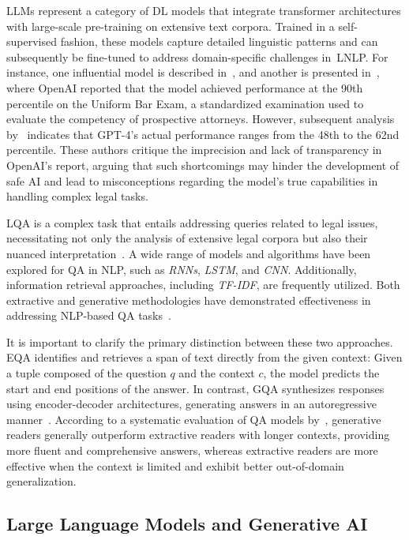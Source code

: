 \documentclass[runningheads]{llncs}
\begin{document}
\Ac{LLMs} represent a category of \ac{DL} models that
integrate transformer architectures with large-scale pre-training on
extensive text corpora. Trained in a self-supervised fashion, these
models capture detailed linguistic patterns and can subsequently be
fine-tuned to address domain-specific challenges in~\ac{LNLP}. For
instance, one influential model is described in~\cite{devlin2018bert},
and another is presented in~\cite{radford2018gpt}, where OpenAI
reported that the model achieved performance at the 90th percentile on
the Uniform Bar Exam, a standardized examination used to evaluate the
competency of prospective attorneys. However, subsequent analysis
by~\cite{Martinez2024} indicates that GPT-4's actual performance
ranges from the 48th to the 62nd percentile. These authors critique
the imprecision and lack of transparency in OpenAI's report, arguing
that such shortcomings may hinder the development of safe \ac{AI} and
lead to misconceptions regarding the model's true capabilities in
handling complex legal tasks.

\Ac{LQA} is a complex task that entails addressing queries related to
legal issues, necessitating not only the analysis of extensive legal
corpora but also their nuanced interpretation~\cite{Ariai2024}. A wide
range of models and algorithms have been explored for \ac{QA} in
\ac{NLP}, such as \textit{\ac{RNNs}}, \textit{\ac{LSTM}}, and
\textit{\ac{CNN}}. Additionally, information retrieval approaches,
including \textit{\ac{TF-IDF}}, are frequently utilized. Both
extractive and generative methodologies have demonstrated
effectiveness in addressing \ac{NLP}-based \ac{QA}
tasks~\cite{Luo2022NLP}.

It is important to clarify the primary distinction between these two
approaches. \Ac{EQA} identifies and retrieves a span of text
directly from the given context: Given a tuple composed of the
question $q$ and the context $c$, the model predicts the
start and end positions of the answer. In contrast, \ac{GQA}
synthesizes responses using encoder-decoder architectures, generating
answers in an autoregressive manner~\cite{Luo2022NLP}. According to a
systematic evaluation of \ac{QA} models by~\cite{Luo2022NLP}, generative
readers generally outperform extractive readers with longer contexts,
providing more fluent and comprehensive answers, whereas extractive
readers are more effective when the context is limited and exhibit
better out-of-domain generalization.


\subsection{Large Language Models and Generative AI}
\label{sec:large-lang-models}
\end{document}
